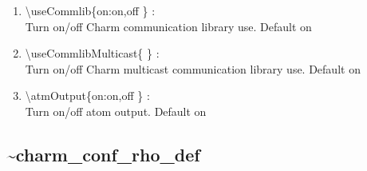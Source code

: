 \documentclass[12pt,titlepage]{article}
\begin{document}
\begin{enumerate}
  \vspace{0.15in} 
  \item  \textbackslash useCommlib\{on:on,off \} : \\
  Turn on/off Charm communication library use. Default on
  \vspace{0.15in} 
  \item  \textbackslash useCommlibMulticast\{ \} : \\   
  \vspace{0.15in} 
  Turn on/off Charm multicast communication library use. Default on
  \item  \textbackslash atmOutput\{on:on,off \} : \\   
  Turn on/off atom output. Default on
\end{enumerate}

\newpage
\subsection*{\bf \~{ }charm\_conf\_rho\_def}
\end{document}
